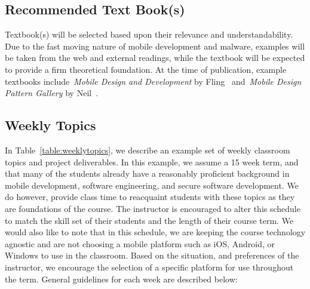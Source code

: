 \documentclass{sig-alternate}
\begin{document}
\subsection{Recommended Text Book(s)}
Textbook(s) will be selected based upon their relevance and understandability. Due to the fast moving nature of mobile development and malware, examples will be taken from the web and external readings, while the textbook will be expected to provide a firm theoretical foundation. At the time of publication, example textbooks include~\emph{Mobile Design and Development} by Fling~\cite{Fling:2009:MDD:1795492} and~\emph{Mobile Design Pattern Gallery} by Neil~\cite{neil2012mobile}.

\subsection{Weekly Topics}

In Table~\ref{table:weeklytopics}, we describe an example set of weekly classroom topics and project deliverables. In this example, we assume a 15 week term, and that many of the students already have a reasonably proficient background in mobile development, software engineering, and secure software development. We do however, provide class time to reacquaint students with these topics as they are foundations of the course.  The instructor is encouraged to alter this schedule to match the skill set of their students and the length of their course term. We would also like to note that in this schedule, we are keeping the course technology agnostic and are not choosing a mobile platform such as iOS, Android, or Windows to use in the classroom. Based on the situation, and preferences of the instructor, we encourage the selection of a specific platform for use throughout the term. General guidelines for each week are described below: \\
\end{document}
